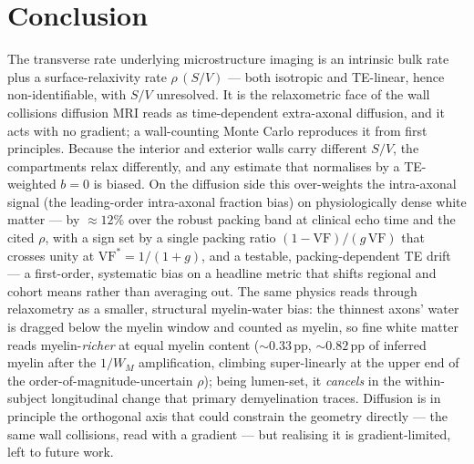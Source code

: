 \section{Conclusion}
\label{sec:conclusion}

The transverse rate underlying microstructure imaging is an intrinsic bulk rate plus a
surface-relaxivity rate $\rho\,(S/V)$ --- both isotropic and TE-linear, hence
non-identifiable, with $S/V$ unresolved. It is the relaxometric face of the wall collisions
diffusion MRI reads as time-dependent extra-axonal diffusion, and it acts with no gradient;
a wall-counting Monte Carlo reproduces it from first principles. Because the interior and
exterior walls carry different $S/V$, the compartments relax differently, and any estimate
that normalises by a TE-weighted $b{=}0$ is biased. On the diffusion side this over-weights
the intra-axonal signal (the leading-order intra-axonal fraction bias) on physiologically
dense white matter --- by ${\approx}12\%$ over the robust packing band at clinical echo
time and the cited $\rho$, with a sign set by a single packing ratio
$(1-\mathrm{VF})/(g\,\mathrm{VF})$ that crosses unity at $\mathrm{VF}^{\ast}=1/(1+g)$, and a
testable, packing-dependent TE drift --- a first-order, systematic bias on a headline metric
that shifts regional and cohort means rather than averaging out. The same physics reads through relaxometry as a smaller, structural
myelin-water bias: the thinnest axons' water is dragged below the myelin window and counted
as myelin, so fine white matter reads myelin-\emph{richer} at equal myelin content
(${\sim}0.33$\,pp, ${\sim}0.82$\,pp of inferred myelin after the $1/W_M$ amplification,
climbing super-linearly at the upper end of the order-of-magnitude-uncertain $\rho$); being
lumen-set, it \emph{cancels} in the within-subject longitudinal change that primary
demyelination traces. Diffusion is in principle the orthogonal axis that could constrain
the geometry directly --- the same wall collisions, read with a gradient --- but realising
it is gradient-limited, left to future work.
